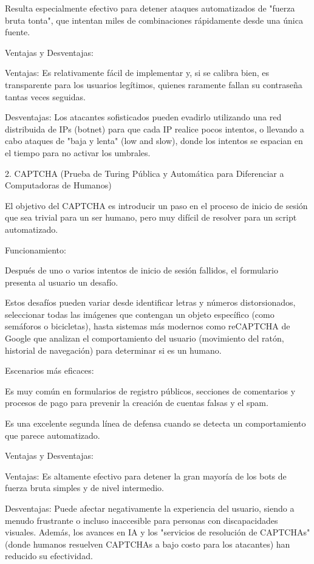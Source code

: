 \documentclass[letterpaper,12pt]{article}
\begin{document}
        Resulta especialmente efectivo para detener ataques automatizados de "fuerza bruta tonta", que intentan miles de combinaciones rápidamente desde una única fuente.

    Ventajas y Desventajas:

        Ventajas: Es relativamente fácil de implementar y, si se calibra bien, es transparente para los usuarios legítimos, quienes raramente fallan su contraseña tantas veces seguidas.

        Desventajas: Los atacantes sofisticados pueden evadirlo utilizando una red distribuida de IPs (botnet) para que cada IP realice pocos intentos, o llevando a cabo ataques de "baja y lenta" (low and slow), donde los intentos se espacian en el tiempo para no activar los umbrales.

2. CAPTCHA (Prueba de Turing Pública y Automática para Diferenciar a Computadoras de Humanos)

El objetivo del CAPTCHA es introducir un paso en el proceso de inicio de sesión que sea trivial para un ser humano, pero muy difícil de resolver para un script automatizado.

    Funcionamiento:

        Después de uno o varios intentos de inicio de sesión fallidos, el formulario presenta al usuario un desafío.

        Estos desafíos pueden variar desde identificar letras y números distorsionados, seleccionar todas las imágenes que contengan un objeto específico (como semáforos o bicicletas), hasta sistemas más modernos como reCAPTCHA de Google que analizan el comportamiento del usuario (movimiento del ratón, historial de navegación) para determinar si es un humano.

    Escenarios más eficaces:

        Es muy común en formularios de registro públicos, secciones de comentarios y procesos de pago para prevenir la creación de cuentas falsas y el spam.

        Es una excelente segunda línea de defensa cuando se detecta un comportamiento que parece automatizado.

    Ventajas y Desventajas:

        Ventajas: Es altamente efectivo para detener la gran mayoría de los bots de fuerza bruta simples y de nivel intermedio.

        Desventajas: Puede afectar negativamente la experiencia del usuario, siendo a menudo frustrante o incluso inaccesible para personas con discapacidades visuales. Además, los avances en IA y los "servicios de resolución de CAPTCHAs" (donde humanos resuelven CAPTCHAs a bajo costo para los atacantes) han reducido su efectividad.
\end{document}
